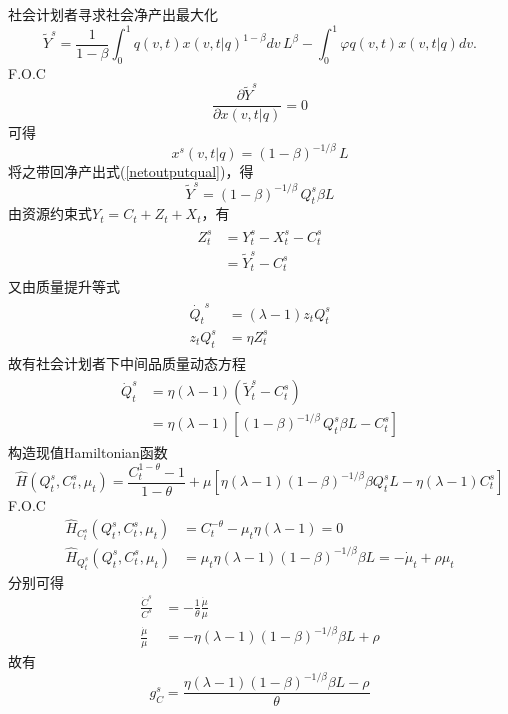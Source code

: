 \documentclass[cn,normal,11pt,black]{elegantnote}
\begin{document}
社会计划者寻求社会净产出最大化
\begin{equation}\label{netoutputqual}
    \tilde Y^s = \frac{1}{1-\beta} \int_0^1 q(v,t)x(v,t|q)^{1-\beta} dv \, L^\beta -
                 \int_0^1 \varphi q(v,t) x(v,t|q)dv. 
\end{equation}
F.O.C
\begin{equation}
    \frac{\partial \tilde Y^s}{\partial x(v,t|q)} = 0
\end{equation}
可得
\begin{equation}
    x^s(v,t|q) = (1-\beta)^{-1/\beta} \, L
\end{equation}
将之带回净产出式(\ref{netoutputqual})，得
\begin{equation}
    \widetilde Y^s = (1-\beta)^{-1/\beta} \, Q^s_t \beta L  
\end{equation}
由资源约束式$Y_t = C_t + Z_t + X_t$，有
\begin{align}
\begin{aligned}
    Z_t^s & = Y_t^s - X_t^s - C_t^s \\
         & = \widetilde Y_t^s - C_t^s
\end{aligned}
\end{align}
又由质量提升等式
\begin{align}
\begin{aligned}
    \dot{Q_t}^s & = (\lambda - 1) z_t Q_t^s \\
       z_t Q_t^s & = \eta Z_t^s
\end{aligned}
\end{align}
故有社会计划者下中间品质量动态方程
\begin{align}
\begin{aligned}
    \dot{Q}^s_t & = \eta (\lambda-1)(\widetilde Y^s_t - C^s_t) \\
               & = \eta (\lambda-1) [ (1-\beta)^{-1/\beta} \, Q^s_t \beta L - C^s_t]
\end{aligned}
\end{align}
构造现值Hamiltonian函数
\begin{equation}
    \hat{H}(Q^s_t, C^s_t, \mu_t) = \frac{C_t^{1-\theta}-1}{1-\theta} + 
                                  \mu\left[\eta(\lambda-1)(1-\beta)^{-1 / \beta} \beta Q^s_t L-\eta(\lambda-1) C^s_t\right]
\end{equation}
F.O.C
\begin{align}
    \hat{H}_{C^s_t}(Q^s_t, C^s_t, \mu_t) & = C_t^{-\theta}- \mu_t \eta(\lambda-1) =0 \\ 
    \hat{H}_{Q^s_t}(Q^s_t, C^s_t, \mu_t) & = \mu_t \eta (\lambda-1)(1-\beta)^{-1 / \beta} \beta L= -\dot{\mu}_t + \rho \mu_t
\end{align}
分别可得
\begin{align}
    \frac{\dot{C}^s}{C^s} & = -\frac{1}{\theta} \frac{\dot{\mu}}{\mu} \\ 
    \frac{\dot{\mu}}{\mu} & = - \eta(\lambda-1) (1-\beta)^{-1/\beta} \beta L + \rho
\end{align}
故有
\begin{equation}\label{qualgcsp}
    g_C^s = \frac{\eta(\lambda-1) (1-\beta)^{-1/\beta} \beta L - \rho}{\theta}
\end{equation}
\end{document}
